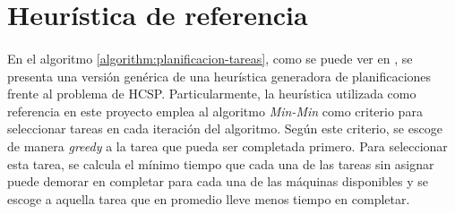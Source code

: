\centerline{
}

\section{Heurística de referencia} \label{section:descripcion-problema,subsection:heuristica}
 
\paragraph{}En el algoritmo \ref{algorithm:planificacion-tareas}, como se puede ver en \citet{bib-doctorado-nesmachnow}, se presenta una versión genérica de una heurística generadora de planificaciones frente al problema de HCSP.
Particularmente, la heurística utilizada como referencia en este proyecto emplea al algoritmo \textit{Min-Min} como criterio para seleccionar tareas en cada iteración del algoritmo.
Según este criterio, se escoge de manera \textit{greedy} a la tarea que pueda ser completada primero.
Para seleccionar esta tarea, se calcula el mínimo tiempo que cada una de las tareas sin asignar puede demorar en completar para cada una de las máquinas disponibles y se escoge a aquella tarea que en promedio lleve menos tiempo en completar.

